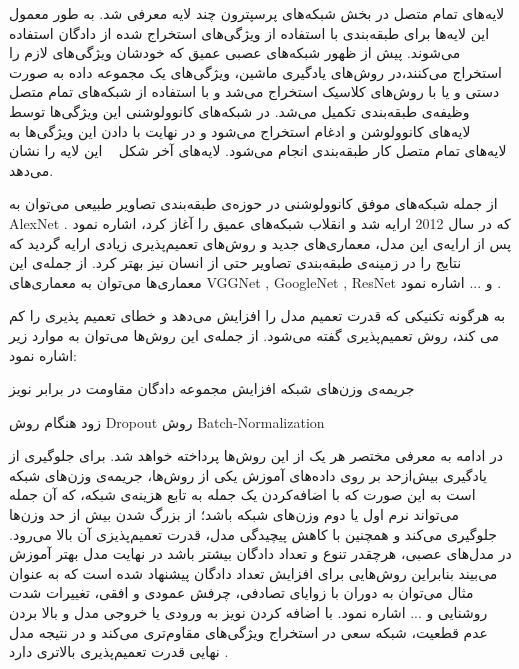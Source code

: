 لایه‌های تمام متصل در بخش‌ شبکه‌های پرسپترون چند لایه معرفی شد. به طور معمول این لایه‌ها برای طبقه‌بندی با استفاده از ویژگی‌های استخراج شده از دادگان استفاده می‌شوند. پیش از ظهور شبکه‌های عصبی عمیق که خودشان ویژگی‌های لازم را استخراج می‌کنند،در روش‌های یادگیری ماشین، ویژگی‌های یک مجموعه داده به صورت دستی و یا با روش‌های کلاسیک استخراج می‌شد و با استفاده از شبکه‌های تمام متصل وظیفه‌ی طبقه‌بندی تکمیل می‌شد. در شبکه‌های کانوولوشنی این ویژگی‌ها توسط لایه‌های کانوولوشن و ادغام استخراج می‌شود و در نهایت با دادن این ویژگی‌ها به لایه‌های تمام متصل کار طبقه‌بندی انجام می‌شود. لایه‌های آخر شکل ~ این لایه را نشان می‌دهد.

از جمله شبکه‌های موفق کانوولوشنی در حوزه‌ی طبقه‌بندی تصاویر طبیعی می‌توان به AlexNet که در سال 2012 ارایه شد و انقلاب شبکه‌های عمیق را آغاز کرد، اشاره نمود . پس از ارایه‌ی این مدل، معماری‌های جدید و روش‌های تعمیم‌پذیری زیادی ارایه گردید که نتایج را در زمینه‌ی طبقه‌بندی تصاویر حتی از انسان نیز بهتر کرد. از جمله‌ی این معماری‌ها می‌توان به معماری‌های
 VGGNet ,
 GoogleNet ,
 ResNet
  و ... اشاره نمود . 
  
به هرگونه تکنیکی که قدرت تعمیم مدل را افزایش می‌دهد و خطای تعمیم پذیری را کم می کند، روش تعمیم‌پذیری گفته می‌شود. از جمله‌ی این روش‌ها می‌توان به موارد زیر اشاره نمود:
\begin{multicols}{2}
	 جریمه‌ی وزن‌های شبکه 
	 افزایش مجموعه دادگان  
	 مقاومت در برابر نویز  
	
	  زود هنگام  
	 روش Dropout
	 روش Batch-Normalization
	
\end{multicols}
در ادامه به معرفی مختصر هر یک از این روش‌ها پرداخته خواهد شد.
برای جلوگیری از یادگیری بیش‌ازحد بر روی داده‌های آموزش یکی از روش‌ها، جریمه‌ی وزن‌های شبکه است به این صورت که با اضافه‌کردن یک جمله به تابع هزینه‌ی شبکه، که آن جمله می‌تواند نرم اول یا دوم وزن‌های شبکه باشد؛ از بزرگ شدن بیش از حد وزن‌ها جلوگیری می‌کند و همچنین با کاهش پیچیدگی مدل، قدرت تعمیم‌پذیزی آن بالا می‌رود.
در مدل‌های عصبی، هرچقدر تنوع و تعداد دادگان بیشتر باشد در نهایت مدل بهتر آموزش می‌بیند بنابراین روش‌هایی برای افزایش تعداد دادگان پیشنهاد شده است که به عنوان مثال می‌توان به دوران با زوایای تصادفی، چرفش عمودی و افقی، تغییرات شدت روشنایی و ... اشاره نمود.
با اضافه کردن نویز به ورودی یا خروجی مدل و بالا بردن عدم قطعیت، شبکه سعی در استخراج ویژگی‌های مقاوم‌تری می‌کند و در نتیجه مدل نهایی قدرت تعمیم‌پذیری بالاتری دارد .

